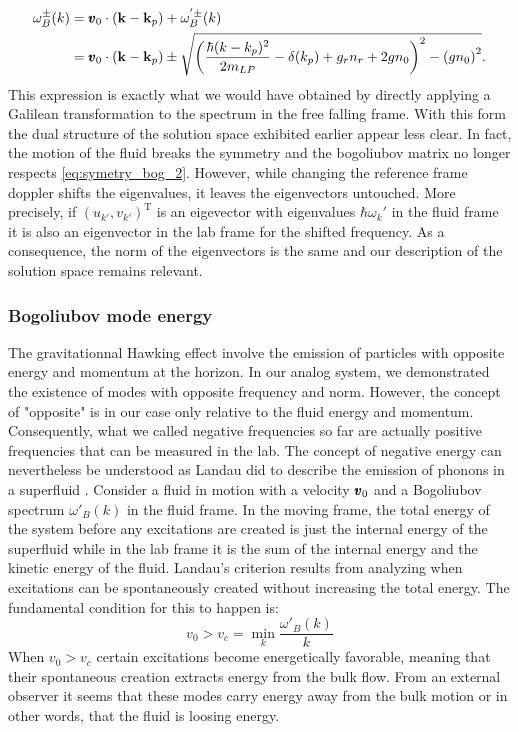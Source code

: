\begin{equation}
    \begin{aligned}
    \omega^{\pm}_B(k)&=\pmb{v}_0\cdot(\mathbf{k}-\mathbf{k}_p)+\omega^{'\pm}_B(k) \\
            &=\pmb{v}_0\cdot(\mathbf{k}-\mathbf{k}_p)\pm\sqrt{\left(\dfrac{\hbar(k-k_p)^2}{2m_{LP}}-\delta(k_p)+ g_rn_r +2g n_0\right)^2 - \left(g n_0\right)^2}.
    \label{eq:bogo_lab_frame}
    \end{aligned}
\end{equation}
This expression is exactly what we would have obtained by directly applying a Galilean transformation to the spectrum in the free falling frame. With this form
the dual structure of the solution space exhibited earlier appear less clear. In fact, the motion of the fluid breaks the symmetry and the bogoliubov matrix no longer respects \autoref{eq:symetry_bog_2}. However, while changing the reference frame doppler shifts the eigenvalues, it leaves the eigenvectors untouched. More precisely, if $(u_{k'},v_{k'})^{\mathrm{T}}$ is an eigevector with eigenvalues $\hbar\omega_k'$ in the fluid frame it is also an eigenvector 
in the lab frame for the shifted frequency. As a consequence, the norm of the eigenvectors is the same and our description of the solution space remains relevant.

\subsubsection{Bogoliubov mode energy}
\label{subsub:bogo_energy}
The gravitationnal Hawking effect involve the emission of particles with opposite energy and momentum at the horizon. In our analog
system, we demonstrated the existence of modes with opposite frequency and norm. However, the concept of "opposite" is in our case only relative to the fluid energy and momentum. Consequently, what we
called negative frequencies so far are actually positive frequencies that can be measured in the lab. The concept of negative energy can nevertheless be understood as Landau did 
to describe the emission of phonons in a superfluid \cite{landau_superfluidity_1941}. Consider a fluid in motion with a velocity $\pmb{v}_0$ and a Bogoliubov spectrum $\omega'_B(k)$ in the fluid frame. 
In the moving frame, the total energy of the system before any excitations are created is just the internal energy of the superfluid while in the lab frame it is the sum of the internal energy and the kinetic energy of the fluid.
Landau's criterion results from analyzing when excitations can be spontaneously created without increasing the total energy. The fundamental condition for this to happen is:
\begin{equation}
    v_0>v_c = \min_k \dfrac{\omega'_B(k)}{k}
\end{equation}
When $v_0>v_c$ certain excitations become energetically favorable, meaning that their spontaneous creation extracts energy from the bulk flow. From
an external observer it seems that these modes carry energy away from the bulk motion or in other words, that the fluid is loosing energy. 

